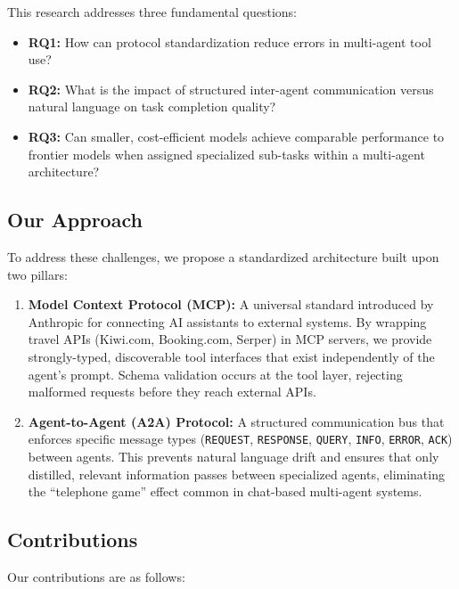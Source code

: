 \documentclass[preprint,review,12pt]{elsarticle}
\begin{document}
This research addresses three fundamental questions:

\begin{itemize}
    \item \textbf{RQ1:} How can protocol standardization reduce errors in multi-agent tool use?
    \item \textbf{RQ2:} What is the impact of structured inter-agent communication versus natural language on task completion quality?
    \item \textbf{RQ3:} Can smaller, cost-efficient models achieve comparable performance to frontier models when assigned specialized sub-tasks within a multi-agent architecture?
\end{itemize}

\subsection{Our Approach}

To address these challenges, we propose a standardized architecture built upon two pillars:

\begin{enumerate}
    \item \textbf{Model Context Protocol (MCP):} A universal standard introduced by Anthropic for connecting AI assistants to external systems. By wrapping travel APIs (Kiwi.com, Booking.com, Serper) in MCP servers, we provide strongly-typed, discoverable tool interfaces that exist independently of the agent's prompt. Schema validation occurs at the tool layer, rejecting malformed requests before they reach external APIs.
    
    \item \textbf{Agent-to-Agent (A2A) Protocol:} A structured communication bus that enforces specific message types (\texttt{REQUEST}, \texttt{RESPONSE}, \texttt{QUERY}, \texttt{INFO}, \texttt{ERROR}, \texttt{ACK}) between agents. This prevents natural language drift and ensures that only distilled, relevant information passes between specialized agents, eliminating the ``telephone game'' effect common in chat-based multi-agent systems.
\end{enumerate}

\subsection{Contributions}

Our contributions are as follows:
\end{document}
